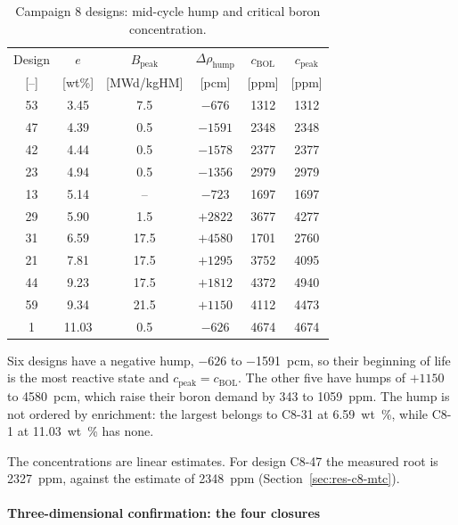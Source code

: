 \begin{table}[htbp]
  \centering
  \small
  \caption{Campaign 8 designs: mid-cycle hump and critical boron concentration.}
  \label{tab:c8-swing}
  \begin{tabular}{@{}cccccc@{}}
    \toprule
    Design & $e$ & $B_\mathrm{peak}$ & $\Delta\rho_\mathrm{hump}$ &
      $c_\mathrm{BOL}$ & $c_\mathrm{peak}$ \\
    {[--]} & [wt\%] & [MWd/kgHM] & [pcm] & [ppm] & [ppm] \\
    \midrule
    53 & 3.45  & 7.5  & $-676$  & 1312 & 1312 \\
    47 & 4.39  & 0.5  & $-1591$ & 2348 & 2348 \\
    42 & 4.44  & 0.5  & $-1578$ & 2377 & 2377 \\
    23 & 4.94  & 0.5  & $-1356$ & 2979 & 2979 \\
    13 & 5.14  & --   & $-723$  & 1697 & 1697 \\
    29 & 5.90  & 1.5  & $+2822$ & 3677 & 4277 \\
    31 & 6.59  & 17.5 & $+4580$ & 1701 & 2760 \\
    21 & 7.81  & 17.5 & $+1295$ & 3752 & 4095 \\
    44 & 9.23  & 17.5 & $+1812$ & 4372 & 4940 \\
    59 & 9.34  & 21.5 & $+1150$ & 4112 & 4473 \\
    1  & 11.03 & 0.5  & $-626$  & 4674 & 4674 \\
    \bottomrule
  \end{tabular}
\end{table}

Six designs have a negative hump, $-626$ to \SI{-1591}{pcm}, so their
beginning of life is the most reactive state and
$c_\mathrm{peak} = c_\mathrm{BOL}$. The other five have humps of
$+1150$ to \SI{+4580}{pcm}, which raise their boron demand by 343 to
\SI{1059}{ppm}. The hump is not ordered by enrichment: the largest
belongs to C8-31 at \SI{6.59}{wt\%}, while C8-1 at \SI{11.03}{wt\%} has
none.

The concentrations are linear estimates. For design C8-47 the measured
root is \SI{2327}{ppm}, against the estimate of \SI{2348}{ppm}
(Section~\ref{sec:res-c8-mtc}).

\paragraph{Three-dimensional confirmation: the four closures}
\label{sec:res-c8-closures}

